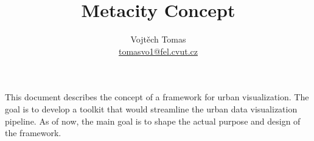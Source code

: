 \documentclass[10pt,twocolumn]{article}
\author{Vojtěch Tomas\\
    \href{mailto:tomasvo1@fit.cvut.cz}{tomasvo1@fel.cvut.cz}}
\title{Metacity Concept}
\date{}
\begin{document}
    
\maketitle


This document describes the concept of a framework for urban visualization. The goal is to develop a toolkit that would streamline the urban data visualization pipeline. As of now, the main goal is to shape the actual purpose and design of the framework. 











\end{document}
